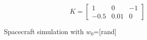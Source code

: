 \documentclass[12pt]{article}
\begin{document}
\begin{equation}
K=
\begin{bmatrix}
1 & 0 & -1\\ -0.5 & 0.01 & 0
\end{bmatrix}
\end{equation}


\begin{figure}[h!]
\centering
{}
\caption{Spacecraft simulation with  $w_{0}$=[rand]}
\label{fig:8}
\end{figure}
\end{document}
